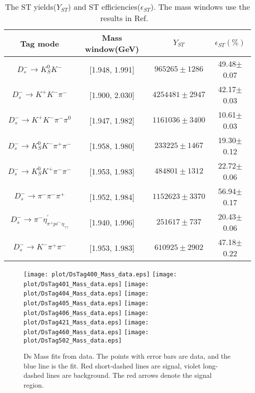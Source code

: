 \begin{table}
    \caption{ The ST yields($Y_{ST}$) and ST efficiencies($\epsilon_{ST}$). The mass windows use the results in Ref. ~\cite{Doc-DB-630-v35} }
    \label{ST-eff}
    \begin{center}
        \begin{tabular}{cccc}
            \toprule\toprule
            Tag mode & Mass window(GeV)  & $Y_{ST}$  & $\epsilon_{ST}(\%)$\\
            \hline
            $D_{s}^{-} \rightarrow K_{S}^{0}K^{-}$                          & [1.948, 1.991]    & $965265\pm1286$               & 49.48$\pm$0.07\\
            $D_{s}^{-} \rightarrow K^{+}K^{-}\pi^{-}$                       & [1.900, 2.030]    & $4254481\pm2947$              & 42.17$\pm$0.03\\
            $D_{s}^{-} \rightarrow K^{+}K^{-}\pi^{-}\pi^{0}$                & [1.947, 1.982]    & $1161036\pm3400$              & 10.61$\pm$0.03\\
            $D_{s}^{-} \rightarrow K_{S}^{0}K^{-}\pi^{+}\pi^{-}$            & [1.958, 1.980]    & $233225\pm1467$               & 19.30$\pm$0.12\\
            $D_{s}^{-} \rightarrow K_{S}^{0}K^{+}\pi^{-}\pi^{-}$            & [1.953, 1.983]    & $484801\pm1312$               & 22.72$\pm$0.06\\
            $D_{s}^{-} \rightarrow \pi^{-}\pi^{-}\pi^{+}$                   & [1.952, 1.984]    & $1152623\pm3370$              & 56.94$\pm$0.17\\
            $D_{s}^{-} \rightarrow \pi^{-}\eta_{\pi^{+}pi^{-}\eta_{\gamma\gamma}}^{'}$          & [1.940, 1.996]    & $251617\pm737$               & 20.43$\pm$0.06\\
            $D_{s}^{-} \rightarrow K^{-}\pi^{+}\pi^{-}$                     & [1.953, 1.983]    & $610925\pm2902$               & 47.18$\pm$0.22\\
            \bottomrule\bottomrule
        \end{tabular}
    \end{center}
\end{table}

\begin{figure*}[!htbp]
 \centering
 \texttt{[image: plot/DsTag400\_Mass\_data.eps]}
 \texttt{[image: plot/DsTag401\_Mass\_data.eps]}
 \texttt{[image: plot/DsTag404\_Mass\_data.eps]}
 \texttt{[image: plot/DsTag405\_Mass\_data.eps]}
 \texttt{[image: plot/DsTag406\_Mass\_data.eps]}
 \texttt{[image: plot/DsTag421\_Mass\_data.eps]}
 \texttt{[image: plot/DsTag460\_Mass\_data.eps]}
 \texttt{[image: plot/DsTag502\_Mass\_data.eps]}
 \caption{Ds Mass fits from data. The points with error bars are data, and the blue line is the fit. Red short-dashed lines are signal, violet long-dashed lines are background. The red arrows denote the signal region.  }
\label{SingleTagFit}
\end{figure*}


